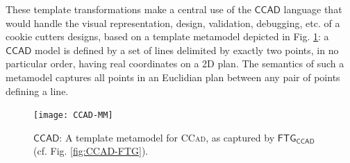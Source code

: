 These template transformations make a central use of the $\mathsf{CCAD}$ 
language that would handle the visual representation, design, validation, 
debugging, etc. of a cookie cutters designs, based on a template metamodel 
depicted in Fig. \ref{fig:CCAD-MM}: a $\mathsf{CCAD}$ model is defined by a set 
of lines delimited by exactly two points, in no particular order, having real 
coordinates on a 2D plan. The semantics of such a metamodel captures all points 
in an Euclidian plan between any pair of points defining a line.

\begin{figure}[t]
\centering
\texttt{[image: CCAD-MM]}
\caption{$\mathsf{CCAD}$: A template metamodel for \textsc{CCad}, as captured 
by $\mathsf{FTG_{CCAD}}$ (cf. Fig. \ref{fig:CCAD-FTG}).}
\label{fig:CCAD-MM}%
\end{figure}

